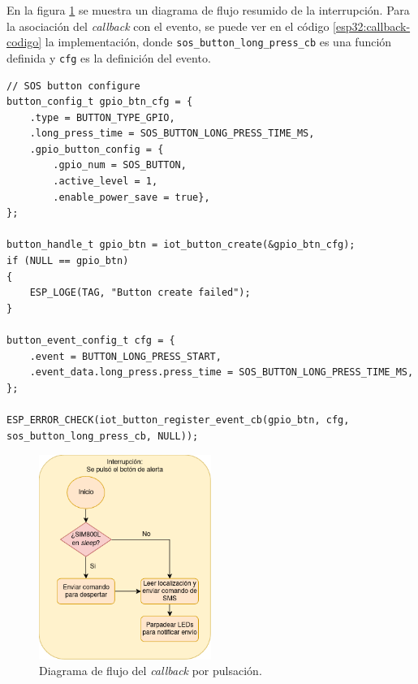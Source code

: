 En la figura \ref{fig:esp32:callback-codigo} se muestra un diagrama de flujo resumido de la interrupción. Para la asociación del \textit{callback} con el evento, se puede ver en el código \ref{esp32:callback-codigo} la implementación, donde \texttt{sos\_button\_long\_press\_cb} es una función definida y \texttt{cfg} es la definición del evento.

\pagebreak

\begin{lstlisting}[label=esp32:callback-codigo,caption=Definición del evento y asociación del \textit{callback}.]  % Start your code-block
// SOS button configure
button_config_t gpio_btn_cfg = {
    .type = BUTTON_TYPE_GPIO,
    .long_press_time = SOS_BUTTON_LONG_PRESS_TIME_MS,
    .gpio_button_config = {
        .gpio_num = SOS_BUTTON,
        .active_level = 1,
        .enable_power_save = true},
};

button_handle_t gpio_btn = iot_button_create(&gpio_btn_cfg);
if (NULL == gpio_btn)
{
    ESP_LOGE(TAG, "Button create failed");
}

button_event_config_t cfg = {
    .event = BUTTON_LONG_PRESS_START,
    .event_data.long_press.press_time = SOS_BUTTON_LONG_PRESS_TIME_MS,
};

ESP_ERROR_CHECK(iot_button_register_event_cb(gpio_btn, cfg, sos_button_long_press_cb, NULL));

\end{lstlisting}

\begin{figure}[H]
	\centering
	\includegraphics[width=0.5\textwidth]{./Figures/esp32-callback.png}
	\caption{Diagrama de flujo del \textit{callback} por pulsación.}
	\label{fig:esp32:callback-codigo}
\end{figure}



